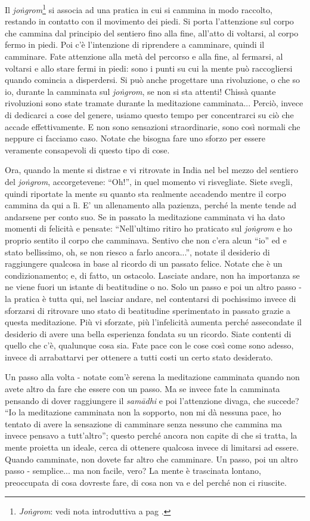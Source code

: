 
Il \textit{joṅgrom}\footnote{\textit{Joṅgrom}: vedi nota introduttiva a pag \pageref{jongrom}.} si associa ad una pratica in cui si cammina in
modo raccolto, restando in contatto con il movimento dei piedi. Si porta
l'attenzione sul corpo che cammina dal principio del sentiero fino alla
fine, all'atto di voltarsi, al corpo fermo in piedi. Poi c'è
l'intenzione di riprendere a camminare, quindi il camminare. Fate
attenzione alla metà del percorso e alla fine, al fermarsi, al voltarsi
e allo stare fermi in piedi: sono i punti su cui la mente può
raccogliersi quando comincia a disperdersi. Si può anche progettare una
rivoluzione, o che so io, durante la camminata sul \textit{joṅgrom}, se non si
sta attenti! Chissà quante rivoluzioni sono state tramate durante la
meditazione camminata... Perciò, invece di dedicarci a cose del genere,
usiamo questo tempo per concentrarci su ciò che accade effettivamente. E
non sono sensazioni straordinarie, sono così normali che neppure ci
facciamo caso. Notate che bisogna fare uno sforzo per essere veramente
consapevoli di questo tipo di cose.

Ora, quando la mente si distrae e vi ritrovate in India nel bel mezzo
del sentiero del \textit{joṅgrom}, accorgetevene: ``Oh!'', in quel momento vi
risvegliate. Siete svegli, quindi riportate la mente su quanto sta
realmente accadendo mentre il corpo cammina da qui a lì. E' un
allenamento alla pazienza, perché la mente tende ad andarsene per conto
suo. Se in passato la meditazione camminata vi ha dato momenti di
felicità e pensate: ``Nell'ultimo ritiro ho praticato sul \textit{joṅgrom} e ho
proprio sentito il corpo che camminava. Sentivo che non c'era alcun ``io''
ed e stato bellissimo, oh, se non riesco a farlo ancora...'', notate il
desiderio di raggiungere qualcosa in base al ricordo di un passato
felice. Notate che è un condizionamento; e, di fatto, un ostacolo.
Lasciate andare, non ha importanza se ne viene fuori un istante di
beatitudine o no. Solo un passo e poi un altro passo - la pratica è
tutta qui, nel lasciar andare, nel contentarsi di pochissimo invece di
sforzarsi di ritrovare uno stato di beatitudine sperimentato in passato
grazie a questa meditazione. Più vi sforzate, più l'infelicità aumenta
perché assecondate il desiderio di avere una bella esperienza fondata su
un ricordo. Siate contenti di quello che c'è, qualunque cosa sia. Fate
pace con le cose così come sono adesso, invece di arrabattarvi per
ottenere a tutti costi un certo stato desiderato.

Un passo alla volta - notate com'è serena la meditazione camminata
quando non avete altro da fare che essere con un passo. Ma se invece
fate la camminata pensando di dover raggiungere il \textit{samādhi} e poi
l'attenzione divaga, che succede? ``Io la meditazione camminata non la
sopporto, non mi dà nessuna pace, ho tentato di avere la sensazione di
camminare senza nessuno che cammina ma invece pensavo a tutt'altro'';
questo perché ancora non capite di che si tratta, la mente proietta un
ideale, cerca di ottenere qualcosa invece di limitarsi ad essere. Quando
camminate, non dovete far altro che camminare. Un passo, poi un altro
passo - semplice... ma non facile, vero? La mente è trascinata lontano,
preoccupata di cosa dovreste fare, di cosa non va e del perché non ci
riuscite.


